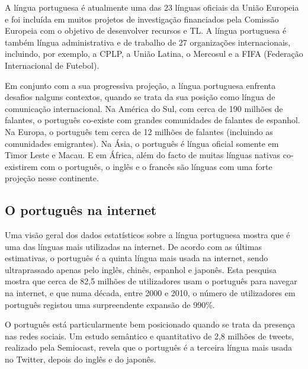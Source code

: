 \documentclass[]{../metanetpaper}
\begin{document}
\begin{multicols}{2}
A língua portuguesa é atualmente uma das 23 línguas oficiais da União Europeia e foi incluída em muitos projetos de investigação financiados pela Comissão Europeia com o objetivo de desenvolver recursos e TL. A língua portuguesa é também língua administrativa e de trabalho de 27 organizações internacionais, incluindo, por exemplo, a CPLP, a União Latina, o Mercosul e a FIFA (Federação Internacional de Futebol). 

Em conjunto com a sua progressiva projeção, a língua portuguesa enfrenta desafios nalguns contextos, quando se trata da sua posição como língua de comunicação internacional. Na América do Sul, com cerca de 190 milhões de falantes, o português co-existe com grandes comunidades de falantes de espanhol. Na Europa, o português tem cerca de 12 milhões de falantes (incluindo as comunidades e\-mi\-gran\-tes). Na Ásia, o português é língua oficial somente em Timor Leste e Macau. E em África, além do facto de muitas línguas nativas co-existirem com o português, o inglês e o francês são línguas com uma forte projeção nesse continente. 


\subsection{O português na internet}

 Uma visão geral dos dados estatísticos sobre a língua portuguesa mostra que é uma das línguas mais utilizadas na internet. De acordo com as últimas estimativas, o português é a quinta língua mais usada na internet, sendo ultraprassado apenas pelo inglês, chinês, espanhol e japonês\cite{stat7}. Esta pesquisa mostra que cerca de 82,5 milhões de utilizadores usam o português para navegar na internet, e que numa década, entre 2000 e 2010, o número de utilizadores em português registou uma surpreendente expansão de 990\%.

O português está particularmente bem posicionado quando se trata da presença nas redes sociais. Um estudo semântico e quantitativo de 2,8 milhões de tweets, realizado pela Semiocast, revela que o português é a terceira língua mais usada no Twitter, depois do inglês e do japonês\cite{twtrcon}.


\end{multicols}
\end{document}
